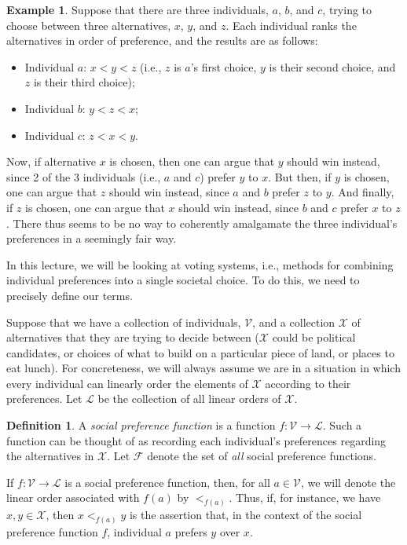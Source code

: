 \documentclass[a4paper]{memoir}
\theoremstyle{definition}
\newtheorem{definition}[theorem]{Definition}
\newtheorem{example}[theorem]{Example}
\newcommand{\mc}{\mathcal}
\newcommand{\ra}{\rightarrow}
\begin{document}
\begin{example}
  Suppose that there are three individuals, $a$, $b$, and $c$, trying to choose between 
  three alternatives, $x$, $y$, and $z$. Each individual ranks the alternatives in order of 
  preference, and the results are as follows:
  \begin{itemize}
    \item Individual $a$: $x < y < z$ (i.e., $z$ is $a$'s first choice, $y$ is their second choice, 
    and $z$ is their third choice);
    \item Individual $b$: $y < z < x$;
    \item Individual $c$: $z < x < y$.
  \end{itemize}
  Now, if alternative $x$ is chosen, then one can argue that $y$ should win instead, since 2 of the 
  3 individuals (i.e., $a$ and $c$) prefer $y$ to $x$. But then, if $y$ is chosen, one can argue that 
  $z$ should win instead, since $a$ and $b$ prefer $z$ to $y$. And finally, if $z$ is chosen, one 
  can argue that $x$ should win instead, since $b$ and $c$ prefer $x$ to $z$. There thus seems to 
  be no way to coherently amalgamate the three individual's preferences in a seemingly fair way.
\end{example}

In this lecture, we will be looking at voting systems, i.e., methods for combining 
individual preferences into a single societal choice. To do this, we need to precisely define 
our terms.

Suppose that we have a collection of individuals, $\mc{V}$, and a collection $\mc{X}$ of alternatives 
that they are trying to decide between ($\mc{X}$ could be political candidates, or choices of 
what to build on a particular piece of land, or places to eat lunch). For concreteness, 
we will always assume we are in a situation in which every individual can linearly order 
the elements of $\mc{X}$ according to their preferences. Let $\mc{L}$ be the 
collection of all linear orders of $\mc{X}$.

\begin{definition}
  A \emph{social preference function} is a function $f: \mc{V} \ra \mc{L}$. Such a function can 
  be thought of as recording each individual's preferences regarding the alternatives in 
  $\mc{X}$. Let $\mc{F}$ denote the set of \emph{all} social preference functions.
\end{definition}

If $f: \mc{V} \ra \mc{L}$ is a social preference function, then, for all $a \in \mc{V}$, we 
will denote the linear order associated with $f(a)$ by $<_{f(a)}$. Thus, if, for instance, 
we have $x,y \in \mc{X}$, then $x <_{f(a)} y$ is the assertion that, in the context of the 
social preference function $f$, individual $a$ prefers $y$ over $x$.
\end{document}
